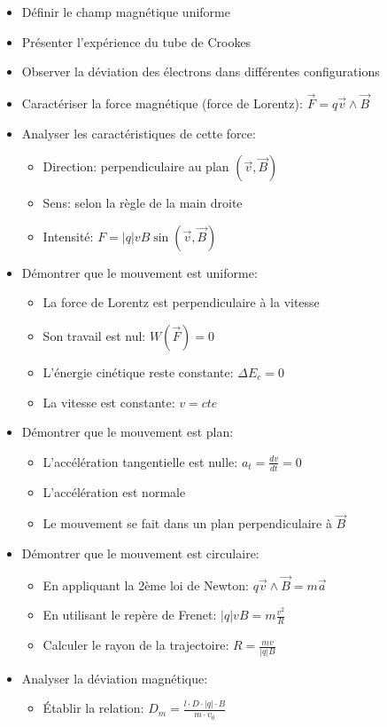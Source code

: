\documentclass[12pt]{article}
\begin{document}
\begin{itemize}
    \item Définir le champ magnétique uniforme
    \item Présenter l'expérience du tube de Crookes
    \item Observer la déviation des électrons dans différentes configurations
    \item Caractériser la force magnétique (force de Lorentz): $\vec{F} = q\vec{v} \wedge \vec{B}$
    \item Analyser les caractéristiques de cette force:
    \begin{itemize}
        \item Direction: perpendiculaire au plan $(\vec{v}, \vec{B})$
        \item Sens: selon la règle de la main droite
        \item Intensité: $F = |q|vB\sin(\vec{v},\vec{B})$
    \end{itemize}
    \item Démontrer que le mouvement est uniforme:
    \begin{itemize}
        \item La force de Lorentz est perpendiculaire à la vitesse
        \item Son travail est nul: $W(\vec{F}) = 0$
        \item L'énergie cinétique reste constante: $\Delta E_c = 0$
        \item La vitesse est constante: $v = cte$
    \end{itemize}
    \item Démontrer que le mouvement est plan:
    \begin{itemize}
        \item L'accélération tangentielle est nulle: $a_t = \frac{dv}{dt} = 0$
        \item L'accélération est normale
        \item Le mouvement se fait dans un plan perpendiculaire à $\vec{B}$
    \end{itemize}
    \item Démontrer que le mouvement est circulaire:
    \begin{itemize}
        \item En appliquant la 2ème loi de Newton: $q\vec{v} \wedge \vec{B} = m\vec{a}$
        \item En utilisant le repère de Frenet: $|q|vB = m\frac{v^2}{R}$
        \item Calculer le rayon de la trajectoire: $R = \frac{mv}{|q|B}$
    \end{itemize}
    \item Analyser la déviation magnétique:
    \begin{itemize}
        \item Établir la relation: $D_m = \frac{l \cdot D \cdot |q| \cdot B}{m \cdot v_0}$
    \end{itemize}
\end{itemize}
\end{document}
